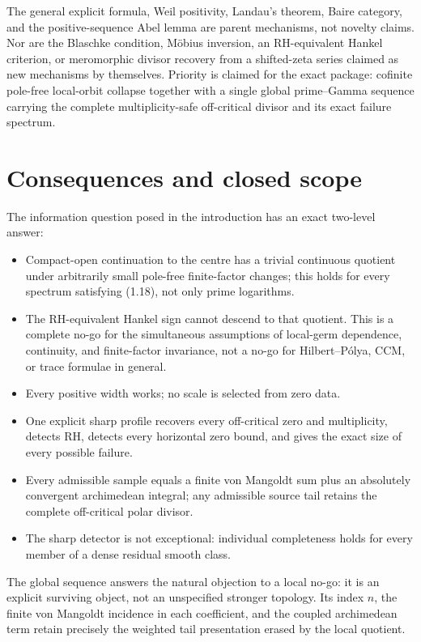 \documentclass[11pt]{article}
\begin{document}
The general explicit formula, Weil positivity, Landau's theorem, Baire category, and the
positive-sequence Abel lemma are parent mechanisms, not novelty claims.  Nor are the Blaschke
condition, M\"obius inversion, an RH-equivalent Hankel criterion, or meromorphic divisor recovery
from a shifted-zeta series claimed as new mechanisms by themselves.  Priority is claimed for the
exact package: cofinite pole-free local-orbit collapse together with a single global
prime--Gamma sequence carrying the complete multiplicity-safe off-critical divisor and its exact
failure spectrum.

\section{Consequences and closed scope}\label{sec:scope}

The information question posed in the introduction has an exact two-level answer:
\begin{itemize}
\item Compact-open continuation to the centre has a trivial continuous quotient under
arbitrarily small pole-free finite-factor changes; this holds for every spectrum satisfying
(1.18), not only prime logarithms.
\item The RH-equivalent Hankel sign cannot descend to that quotient.  This is a complete no-go
for the simultaneous assumptions of local-germ dependence, continuity, and finite-factor
invariance, not a no-go for Hilbert--P\'olya, CCM, or trace formulae in general.
\item Every positive width works; no scale is selected from zero data.
\item One explicit sharp profile recovers every off-critical zero and multiplicity, detects RH,
detects every horizontal zero bound, and gives the exact size of every possible failure.
\item Every admissible sample equals a finite von Mangoldt sum plus an absolutely convergent
archimedean integral; any admissible source tail retains the complete off-critical polar divisor.
\item The sharp detector is not exceptional: individual completeness holds for every member of a
dense residual smooth class.
\end{itemize}

The global sequence answers the natural objection to a local no-go: it is an explicit surviving
object, not an unspecified stronger topology.  Its index \(n\), the finite von Mangoldt
incidence in each coefficient, and the coupled archimedean term retain precisely the weighted
tail presentation erased by the local quotient.
\end{document}

